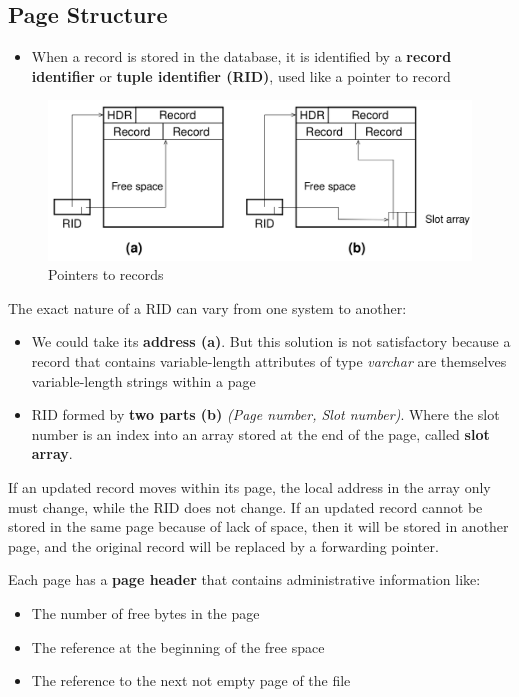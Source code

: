 \subsection{Page Structure}
\begin{itemize}
    \item When a record is stored in the database, it is identified by a \textbf{record identifier} or \textbf{tuple identifier (RID)}, used like a pointer to record
\end{itemize}
\begin{figure}[!h]
        \centering
        \includegraphics[width=0.7\linewidth]{images/DBMS_Internals/pointers_to_records.jpeg}
        \caption{Pointers to records}
\end{figure}
The exact nature of a RID can vary from one system to another:
\begin{itemize}
    \item We could take its \textbf{address (a)}. But this solution is not satisfactory because a record that contains variable-length attributes of type \textit{varchar} are themselves variable-length strings within a page
    \item RID formed by \textbf{two parts (b)} \textit{(Page number, Slot number)}. Where the slot number is an index into an array stored at the end of the page, called \textbf{slot array}.
\end{itemize}
If an updated record moves within its page, the local address in the array only must change, while the RID does not change. If an updated record cannot be stored in the same page because of lack of space, then it will be stored in another page, and the original record will be replaced by a forwarding pointer.

Each page has a \textbf{page header} that contains administrative information like:
\begin{itemize}
    \item The number of free bytes in the page
    \item The reference at the beginning of the free space
    \item The reference to the next not empty page of the file
\end{itemize}

